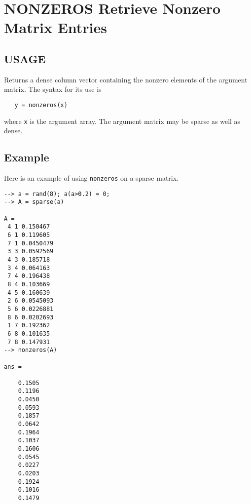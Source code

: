 \section{NONZEROS Retrieve Nonzero Matrix Entries}

\subsection{USAGE}

Returns a dense column vector containing the nonzero elements
of the argument matrix.  The syntax for its use is
\begin{verbatim}
   y = nonzeros(x)
\end{verbatim}
where \verb|x| is the argument array.  The argument matrix may
be sparse as well as dense.
\subsection{Example}

Here is an example of using \verb|nonzeros| on a sparse matrix.
\begin{verbatim}
--> a = rand(8); a(a>0.2) = 0;
--> A = sparse(a)

A = 
 4 1 0.150467
 6 1 0.119605
 7 1 0.0450479
 3 3 0.0592569
 4 3 0.185718
 3 4 0.064163
 7 4 0.196438
 8 4 0.103669
 4 5 0.160639
 2 6 0.0545093
 5 6 0.0226881
 8 6 0.0202693
 1 7 0.192362
 6 8 0.101635
 7 8 0.147931
--> nonzeros(A)

ans = 

    0.1505 
    0.1196 
    0.0450 
    0.0593 
    0.1857 
    0.0642 
    0.1964 
    0.1037 
    0.1606 
    0.0545 
    0.0227 
    0.0203 
    0.1924 
    0.1016 
    0.1479 
\end{verbatim}
